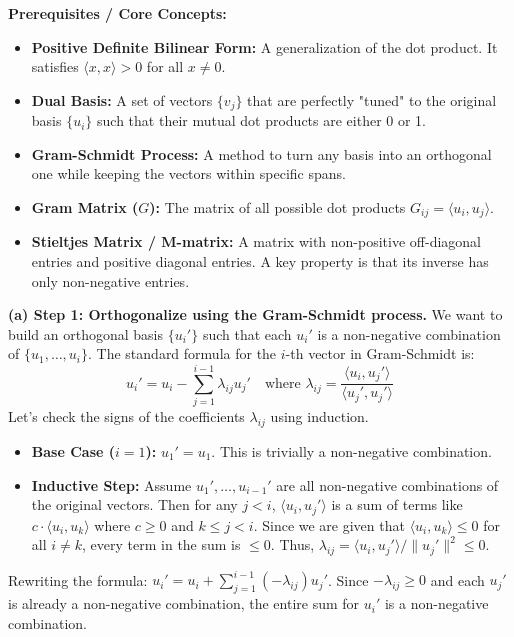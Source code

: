 \begin{solution}
\textbf{Prerequisites / Core Concepts:}
\begin{itemize}
    \item \textbf{Positive Definite Bilinear Form:} A generalization of the dot product. It satisfies $\langle x, x \rangle > 0$ for all $x \neq 0$.
    \item \textbf{Dual Basis:} A set of vectors $\{v_j\}$ that are perfectly "tuned" to the original basis $\{u_i\}$ such that their mutual dot products are either 0 or 1.
    \item \textbf{Gram-Schmidt Process:} A method to turn any basis into an orthogonal one while keeping the vectors within specific spans.
    \item \textbf{Gram Matrix ($G$):} The matrix of all possible dot products $G_{ij} = \langle u_i, u_j \rangle$.
    \item \textbf{Stieltjes Matrix / M-matrix:} A matrix with non-positive off-diagonal entries and positive diagonal entries. A key property is that its inverse has only non-negative entries.
\end{itemize}

\textbf{(a) Step 1: Orthogonalize using the Gram-Schmidt process.}
We want to build an orthogonal basis $\{u_i'\}$ such that each $u_i'$ is a non-negative combination of $\{u_1, \dots, u_i\}$.
The standard formula for the $i$-th vector in Gram-Schmidt is:
\[ u_i' = u_i - \sum_{j=1}^{i-1} \lambda_{ij} u_j' \quad \text{where } \lambda_{ij} = \frac{\langle u_i, u_j' \rangle}{\langle u_j', u_j' \rangle} \]
Let's check the signs of the coefficients $\lambda_{ij}$ using induction.
\begin{itemize}
    \item \textbf{Base Case ($i=1$):} $u_1' = u_1$. This is trivially a non-negative combination.
    \item \textbf{Inductive Step:} Assume $u_1', \dots, u_{i-1}'$ are all non-negative combinations of the original vectors.
    Then for any $j < i$, $\langle u_i, u_j' \rangle$ is a sum of terms like $c \cdot \langle u_i, u_k \rangle$ where $c \geq 0$ and $k \leq j < i$.
    Since we are given that $\langle u_i, u_k \rangle \leq 0$ for all $i \neq k$, every term in the sum is $\leq 0$.
    Thus, $\lambda_{ij} = \langle u_i, u_j' \rangle / \|u_j'\|^2 \leq 0$.
\end{itemize}
Rewriting the formula: $u_i' = u_i + \sum_{j=1}^{i-1} (-\lambda_{ij}) u_j'$.
Since $-\lambda_{ij} \geq 0$ and each $u_j'$ is already a non-negative combination, the entire sum for $u_i'$ is a non-negative combination.


\end{solution}

